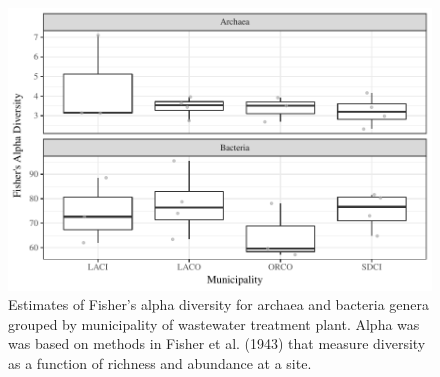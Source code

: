 \documentclass[letterpaper,12pt]{article}\usepackage[]{graphicx}\usepackage[]{color}
\makeatletter
\def\maxwidth{ %
  \ifdim\Gin@nat@width>\linewidth
    \linewidth
  \else
    \Gin@nat@width
  \fi
}
\newenvironment{knitrout}{}{} %
\makeatother
\begin{document}
\clearpage
\begin{knitrout}
\color{fgcolor}\begin{figure}[!ht]

{\centering \includegraphics[width=\maxwidth]{figs/boxdivwwtp} 

}

\caption[Estimates of Fisher's alpha diversity for archaea and bacteria genera grouped by municipality of wastewater treatment plant]{Estimates of Fisher's alpha diversity for archaea and bacteria genera grouped by municipality of wastewater treatment plant. Alpha was was based on methods in Fisher et al. (1943) that measure diversity as a function of richness and abundance at a site.}\label{fig:boxdivwwtp}
\end{figure}


\end{knitrout}
\end{document}
